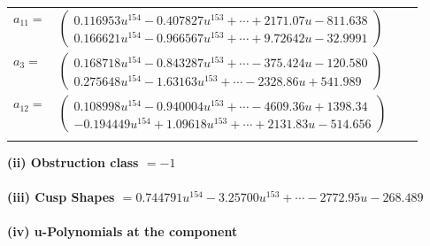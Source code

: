 \documentclass[1p]{elsarticle_modified}
\theoremstyle{definition}
\begin{document}
\begin{tabular}{m{7pt} m{180pt} m{7pt} m{180pt} }
\flushright $a_{11}=$&$\begin{pmatrix}0.116953 u^{154}-0.407827 u^{153}+\cdots+2171.07 u-811.638\\0.166621 u^{154}-0.966567 u^{153}+\cdots+9.72642 u-32.9991\end{pmatrix}$ \\
\flushright $a_{3}=$&$\begin{pmatrix}0.168718 u^{154}-0.843287 u^{153}+\cdots-375.424 u-120.580\\0.275648 u^{154}-1.63163 u^{153}+\cdots-2328.86 u+541.989\end{pmatrix}$ \\
\flushright $a_{12}=$&$\begin{pmatrix}0.108998 u^{154}-0.940004 u^{153}+\cdots-4609.36 u+1398.34\\-0.194449 u^{154}+1.09618 u^{153}+\cdots+2131.83 u-514.656\end{pmatrix}$\\&\end{tabular}
\flushleft \textbf{(ii) Obstruction class $= -1$}\\~\\
\flushleft \textbf{(iii) Cusp Shapes $= 0.744791 u^{154}-3.25700 u^{153}+\cdots-2772.95 u-268.489$}\\~\\
\newpage\renewcommand{\arraystretch}{1}
\flushleft \textbf{(iv) u-Polynomials at the component}\newline \\
\end{document}
